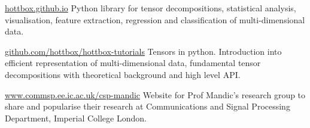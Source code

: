 

\begin{cventries}

            {\href{https://hottbox.github.io}{hottbox.github.io}} %
            { %
                Python library for tensor decompositions, statistical analysis, visualisation, feature extraction, regression and classification of multi-dimensional data.
            }

            {\href{https://github.com/hottbox/hottbox-tutorials}{github.com/hottbox/hottbox-tutorials}} %
            { %
                Tensors in python. Introduction into efficient representation of multi-dimensional data, fundamental tensor decompositions with theoretical background and high level API.
            }

            {\href{http://www.commsp.ee.ic.ac.uk/~csp-mandic/}{www.commsp.ee.ic.ac.uk/\urltilde csp-mandic}} %
            { %
                Website for Prof Mandic's research group to share and popularise their research at Communications and Signal Processing Department, Imperial College London.
            }

\end{cventries}
